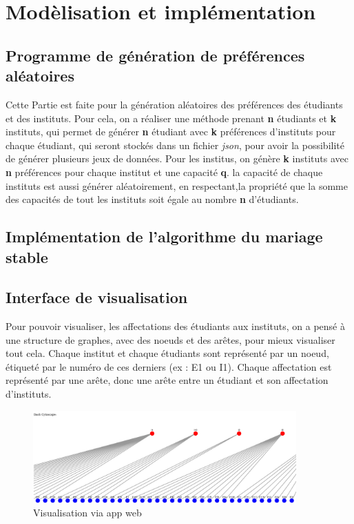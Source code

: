 \documentclass[12pt,titlepage]{article}
\begin{document}
\section{Modèlisation et implémentation}

\subsection{Programme de génération de préférences aléatoires}
Cette Partie est faite pour la génération aléatoires des préférences des étudiants et des instituts. Pour cela, on a réaliser une méthode prenant \textbf{n} étudiants et \textbf{k} instituts, qui permet de générer \textbf{n} étudiant avec \textbf{k} préférences d'instituts pour chaque étudiant, qui seront stockés dans un fichier \textit{json}, pour avoir la possibilité de générer plusieurs jeux de données. Pour les institus, on génère \textbf{k} instituts avec \textbf{n} préférences pour chaque institut et une capacité \textbf{q}. la capacité de chaque instituts est aussi générer aléatoirement, en respectant,la propriété que la somme des capacités de tout les instituts soit égale au nombre \textbf{n} d'étudiants.

\subsection{Implémentation de l'algorithme du mariage stable}



\subsection{Interface de visualisation}
Pour pouvoir visualiser, les affectations des étudiants aux instituts, on a pensé à une structure de graphes, avec des noeuds et des arêtes, pour mieux visualiser tout cela.
Chaque institut et chaque étudiants sont représenté par un noeud, étiqueté par le numéro de ces derniers (ex : E1 ou I1). 
Chaque affectation est représenté par une arête, donc une arête entre un étudiant et son affectation d'instituts.

\begin{figure}[!h]
  \centering
  \caption{Visualisation via app web}
  \includegraphics[width = 0.9\textwidth]{img/Screen_graph_dash.png}
\end{figure}
\end{document}
